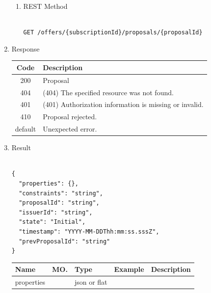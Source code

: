 \begin{enumerate}
\begin{enumerate}
\item REST Method

\begin{tcolorbox}[boxrule=0pt, frame empty]
\begin{verbatim} 

GET /offers/{subscriptionId}/proposals/{proposalId}

\end{verbatim}
\end{tcolorbox}

\end{enumerate}

\item Response

\begin{center}
\begin{tabular}{|c|l|} 
\hline
\rowcolor{lightgray}	Code 		& 	Description \\
\hline
200	 		&	Proposal  \\
\hline
404			&	(404) The specified resource was not found. \\
\hline
401			&	(401) Authorization information is missing or invalid. \\
\hline
410			&	Proposal rejected. \\
\hline
default		&	Unexpected error. \\
\hline
\end{tabular}
\end{center}


\item Result

\begin{tcolorbox}[boxrule=0pt, frame empty]
\begin{verbatim}

{
  "properties": {},
  "constraints": "string",
  "proposalId": "string",
  "issuerId": "string",
  "state": "Initial",
  "timestamp": "YYYY-MM-DDThh:mm:ss.sssZ",
  "prevProposalId": "string"
}

\end{verbatim}
\end{tcolorbox}

\begin{center}
\begin{tabular}{|p{3cm}|l|p{3cm}|p{3cm}|p{4cm}|} 
\hline
\rowcolor{lightgray}	Name	& MO.	& Type	& Example & 	Description \\
\hline

properties	& 	& 	json or flat		&								&	 \\ 


\end{tabular}
\end{center}
\end{enumerate}
